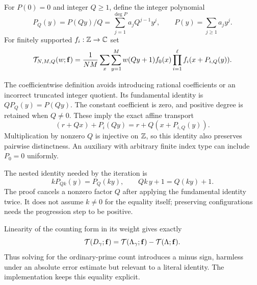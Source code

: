 \begin{definition}\label{def:rescaling}
For $P(0)=0$ and integer $Q\geq1$, define the integer polynomial
\[
 P_Q(y)=P(Qy)/Q=\sum_{j=1}^{\deg P}a_jQ^{j-1}y^j,
 \qquad P(y)=\sum_{j\geq1}a_jy^j.
\]
For finitely supported $f_i:\mathbb Z\to\mathbb C$ set
\[
 \mathcal T_{N,M,Q}(w;\mathbf f)=\frac1{NM}\sum_x\sum_{y=1}^M
 w(Qy+1)f_0(x)\prod_{i=1}^{\ell}f_i(x+P_{i,Q}(y)).
\]
\end{definition}
\ifDetailed
The coefficientwise definition avoids introducing rational coefficients or an incorrect truncated integer quotient. Its fundamental identity is $Q P_Q(y)=P(Qy)$. The constant coefficient is zero, and positive degree is retained when $Q\neq0$. These imply the exact affine transport
\[
 (r+Qx)+P_i(Qy)=r+Q(x+P_{i,Q}(y)).
\]
Multiplication by nonzero $Q$ is injective on $\mathbb Z$, so this identity also preserves pairwise distinctness. An auxiliary with arbitrary finite index type can include $P_0=0$ uniformly.

The nested identity needed by the iteration is
\[
 kP_{Qk}(y)=P_Q(ky),\qquad Qk\,y+1=Q(ky)+1.
\]
The proof cancels a nonzero factor $Q$ after applying the fundamental identity twice. It does not assume $k\neq0$ for the equality itself; preserving configurations needs the progression step to be positive.

Linearity of the counting form in its weight gives exactly
\[
 \mathcal T(D_\gamma;\mathbf f)
 =\mathcal T(\Lambda_\gamma;\mathbf f)-\mathcal T(\Lambda;\mathbf f).
\]
Thus solving for the ordinary-prime count introduces a minus sign, harmless under an absolute error estimate but relevant to a literal identity. The implementation keeps this equality explicit.
\fi

